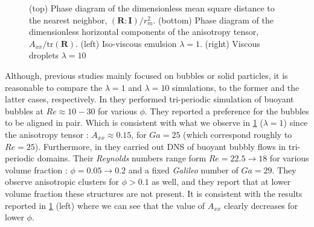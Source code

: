 \begin{figure}[h!]
    \caption{
        (top) Phase diagram of the dimensionless mean square distance to the nearest neighbor, $(\textbf{R}:\textbf{I})/r_m^2$.
        (bottom) Phase diagram of the dimensionless horizontal components of the anisotropy tensor, $A_{xx}/\text{tr}(\textbf{R})$.  
        (left) Iso-viscous emulsion $\lambda = 1$.
        (right) Viscous droplets $\lambda = 10$ }
    \label{fig:phase}
\end{figure}

Although, previous studies mainly focused on bubbles or solid particles, it is reasonable to compare the $\lambda = 1$ and $\lambda = 10$ simulations, to the former and the latter cases, respectively. 
In \citet{bunner2002dynamics} they performed tri-periodic simulation of buoyant bubbles at $Re \approx 10-30$ for various $\phi$.
They reported a preference for the bubbles to be aligned in pair. 
Which is consistent with what we observe in \ref{fig:phase} ($\lambda = 1$) since the anisotropy tensor : $A_{xx} \approx 0.15$, for $Ga = 25$ (which correspond roughly to $Re = 25$). 
Furthermore, in \citet{zhang2021direct} they carried out DNS of buoyant bubbly flows in tri-periodic domains.
Their \textit{Reynolds} numbers range form $Re=22.5\to 18$ for various volume fraction : $\phi = 0.05\to 0.2$ and a fixed \textit{Galileo} number of $Ga = 29$. 
They observe anisotropic clusters for $\phi >0.1$ as well, and they report that at lower volume fraction these structures are not present. 
It is consistent with the results reported in \ref{fig:phase} (left) where we can see that the value of $A_{xx}$ clearly decreases for lower $\phi$. 

